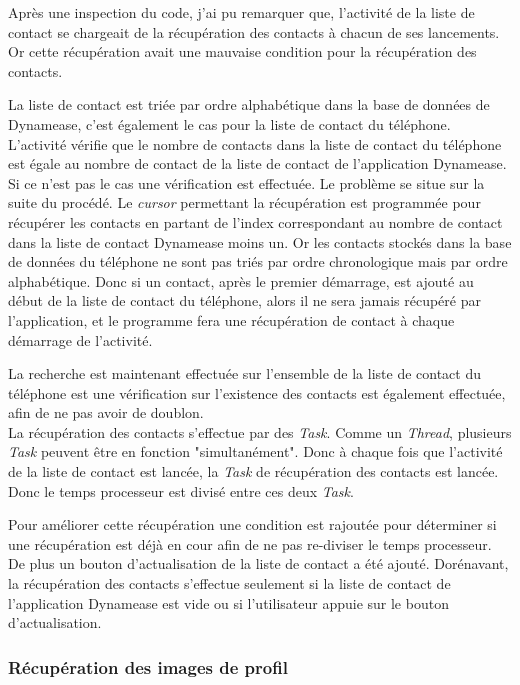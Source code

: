 Après une inspection du code, j'ai pu remarquer que, l'activité de la liste de contact se chargeait de la récupération des contacts à chacun de ses lancements. Or cette récupération avait une mauvaise condition pour la récupération des contacts.

La liste de contact est triée par ordre alphabétique dans la base de données de Dynamease, c'est également le cas pour la liste de contact du téléphone. L'activité vérifie que le nombre de contacts dans la liste de contact du téléphone est égale au nombre de contact de la liste de contact de l'application Dynamease. Si ce n'est pas le cas une vérification est effectuée. Le problème se situe sur la suite du procédé. Le \textit{cursor} permettant la récupération est programmée pour récupérer les contacts en partant de l'index correspondant au nombre de contact dans la liste de contact Dynamease moins un. Or les contacts stockés dans la base de données du téléphone ne sont pas triés par ordre chronologique mais par ordre alphabétique. Donc si un contact, après le premier démarrage, est ajouté au début de la liste de contact du téléphone, alors il ne sera jamais récupéré par l'application, et le programme fera une récupération de contact à chaque démarrage de l'activité.

La recherche est maintenant effectuée sur l'ensemble de la liste de contact du téléphone est une vérification sur l'existence des contacts est également effectuée, afin de ne pas avoir de doublon.\\ 

La récupération des contacts s'effectue par des \textit{Task}. Comme un \textit{Thread}, plusieurs \textit{Task} peuvent être en fonction "simultanément". Donc à chaque fois que l'activité de la liste de contact est lancée, la \textit{Task} de récupération des contacts est lancée. Donc le temps processeur est divisé entre ces deux \textit{Task}.

Pour améliorer cette récupération une condition est rajoutée pour déterminer si une récupération est déjà en cour afin de ne pas re-diviser le temps processeur. De plus un bouton d'actualisation de la liste de contact a été ajouté. Dorénavant, la récupération des contacts s'effectue seulement si la liste de contact de l'application Dynamease est vide ou si l'utilisateur appuie sur le bouton d'actualisation.

\subsubsection{Récupération des images de profil}

